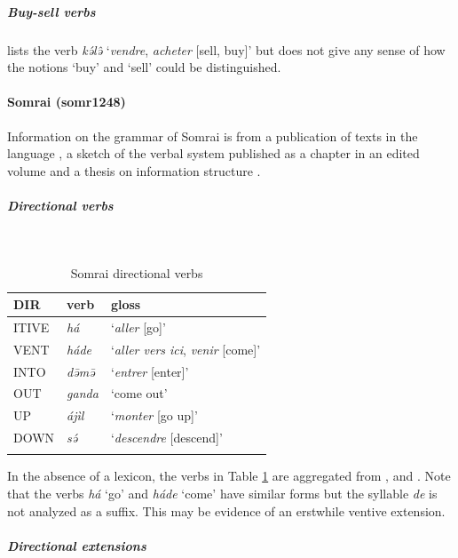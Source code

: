 \subparagraph{Buy-sell verbs}

\citet[81]{brossMaterialenZurSprache1988} lists the verb \textit{kə́lə̂} `\textit{vendre}, \textit{acheter} [sell, buy]' but does not give any sense of how the notions `buy' and `sell' could be distinguished. 

\paragraph*{Somrai (somr1248)} \label{somr}

Information on the grammar of Somrai is from a publication of texts in the language \citep{jungraithmayrPresentationDunConte1978}, a sketch of the verbal system published as a chapter in an edited volume \citep{barreteauVerbeSibine1982} and a thesis on information structure \citep{millerInformationStructureSoumraye2020}.

\subparagraph{Directional verbs}~

\begin{table}[H]
	\caption{Somrai directional verbs}
	\label{tab:somrV}
	\begin{tabular}{lll} %
		\lsptoprule
		DIR & verb & gloss   \\ %
		\midrule
		ITIVE & \textit{há} & `\textit{aller} [go]' \\
		VENT & \textit{háde} & `\textit{aller vers ici}, \textit{venir} [come]' \\
		INTO& \textit{də̄mə̄} & `\textit{entrer} [enter]' \\
		OUT & \textit{ganda} & `come out' \\
		UP & \textit{ájìl} & `\textit{monter} [go up]' \\
		DOWN & \textit{sə́} & `\textit{descendre} [descend]' \\
		\lspbottomrule
	\end{tabular}
\end{table}

In the absence of a lexicon, the verbs in Table \ref{tab:somrV} are aggregated from \citet{jungraithmayrPresentationDunConte1978}, \citet{barreteauVerbeSibine1982} and \citet{millerInformationStructureSoumraye2020}. Note that the verbs \textit{há} `go' and \textit{háde} `come' have similar forms but the syllable \textit{de} is not analyzed as a suffix. This may be evidence of an erstwhile ventive extension.

\subparagraph{Directional extensions}

